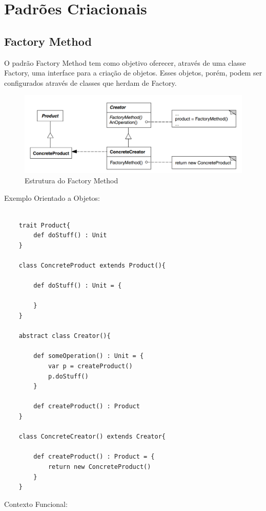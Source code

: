 \chapter{Padrões Criacionais}

\section{Factory Method}

O padrão Factory Method tem como objetivo oferecer, através de uma 
classe Factory, uma interface para a criação de objetos. Esses objetos, 
porém, podem ser configurados através de classes que herdam de Factory.


\begin{figure}[htb]
	\caption{\label{fig_grafico}Estrutura do Factory Method}
	\begin{center}
	    \includegraphics[scale=0.5]{5_padroes-contexto-funcional/5.1_criacionais/5.1.1_factory-method/diagram.png}
	\end{center}
\end{figure}

Exemplo Orientado a Objetos:

\begin{lstlisting}[caption={Factory Method Orientado a Objetos},label=oofactory]
    
    trait Product{
        def doStuff() : Unit
    }

    class ConcreteProduct extends Product(){

        def doStuff() : Unit = {
            
        }
    }

    abstract class Creator(){

        def someOperation() : Unit = {
            var p = createProduct()
            p.doStuff()
        }

        def createProduct() : Product
    }

    class ConcreteCreator() extends Creator{

        def createProduct() : Product = {
            return new ConcreteProduct()
        }
    }

\end{lstlisting}

Contexto Funcional:

\begin{lstlisting}[caption={Factory Method Funcional},label=fpfactory]
    
    

\end{lstlisting}